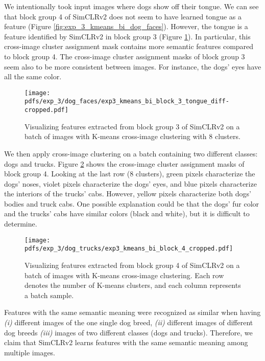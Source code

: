         We intentionally took input images where  dogs show off their tongue. We can see that block group 4 of SimCLRv2 does not seem to have learned tongue as a feature (Figure \ref{fig:exp_3_kmeans_bi_dog_faces}). 
        However, the tongue is a feature identified by SimCLRv2 in block group 3 (Figure \ref{fig:exp_3_block_3_dog_faces}). In particular, this cross-image cluster assignment mask contains more semantic features compared to block group 4. The cross-image cluster assignment masks of block group 3 seem also to be more consistent between images. For instance, the dogs' eyes have all the same color.  
        \begin{figure}[H]
            \centering
            \texttt{[image: pdfs/exp\_3/dog\_faces/exp3\_kmeans\_bi\_block\_3\_tongue\_diff-cropped.pdf]}
            \caption{Visualizing features extracted from block group 3 of SimCLRv2 on a batch of images with K-means cross-image clustering with 8 clusters.}
            \label{fig:exp_3_block_3_dog_faces}
        \end{figure}
        We then apply cross-image clustering on a batch containing two different classes: dogs and trucks.
        Figure \ref{fig:exp_3_kmeans_bi_dog_trucks} shows the cross-image cluster assignment masks of block group 4. Looking at the last row (8 clusters), green pixels characterize the dogs' noses, violet pixels characterize the dogs' eyes, and blue pixels characterize the interiors of the trucks' cabs. However, yellow pixels characterize both dogs' bodies and truck cabs. One possible explanation could be that the dogs' fur color and the trucks' cabs have similar colors (black and white), but it is difficult to determine.
        
        \begin{figure}[H]
            \centering
            \texttt{[image: pdfs/exp\_3/dog\_trucks/exp3\_kmeans\_bi\_block\_4\_cropped.pdf]}
            \caption{Visualizing features extracted from block group 4 of SimCLRv2 on a batch of images with K-means cross-image clustering. Each row denotes the number of K-means clusters, and each column represents a batch sample.}
            \label{fig:exp_3_kmeans_bi_dog_trucks}
        \end{figure}
        Features with the same semantic meaning were recognized as similar when having \textit{(i)} different images of the one single dog breed, \textit{(ii)} different images of different dog breeds \textit{(iii)} images of two different classes (dogs and trucks).
        Therefore, we claim that SimCLRv2 learns features with the same semantic meaning among multiple images.
        
